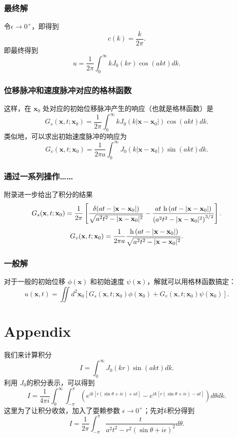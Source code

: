 \documentclass[CJK]{beamer}
\begin{document}
\begin{frame}
  \frametitle{最终解}
  令$\epsilon\rightarrow 0^+$，即得到
  $$c(k) = \frac{k}{2\pi}.$$
  即最终得到
  $$ u = \frac{1}{2\pi} \int_0^\infty  k J_0(kr)\cos(akt)  dk.$$
\end{frame}


\begin{frame}
  \frametitle{位移脉冲和速度脉冲对应的格林函数}
  这样，在 $\mathbf{x}_0$ 处对应的初始位移脉冲产生的响应（也就是格林函数）是
  $$ G_s(\mathbf{x},t;\mathbf{x}_0) = \frac{1}{2\pi} \int_0^\infty  k J_0(k|\mathbf{x}-\mathbf{x}_0|)\cos(akt)  dk.$$  
  类似地，可以求出初始速度脉冲的响应为
  $$ G_v(\mathbf{x},t;\mathbf{x}_0) = \frac{1}{2\pi a} \int_0^\infty   J_0(k|\mathbf{x}-\mathbf{x}_0|)\sin(akt)  dk.$$  
\end{frame}


\begin{frame}
  \frametitle{通过一系列操作……}
  附录进一步给出了积分的结果
  $$ G_s(\mathbf{x},t;\mathbf{x}_0) =\frac{1}{2\pi}\left[ \frac{\delta(at-|\mathbf{x}-\mathbf{x}_0|)}{\sqrt{a^2t^2-|\mathbf{x}-\mathbf{x}_0|^2}} - \frac{at\, \,\mathrm{h}\,(at-|\mathbf{x}-\mathbf{x}_0|)}{\left(a^2t^2-|\mathbf{x}-\mathbf{x}_0|^2\right)^{3/2}}\right].$$
  $$ G_v(\mathbf{x},t;\mathbf{x}_0) = \frac{1}{2\pi a}\frac{\,\mathrm{h}\,(at-|\mathbf{x}-\mathbf{x}_0|)}{\sqrt{a^2t^2-|\mathbf{x}-\mathbf{x}_0|^2}}.$$
\end{frame}


\begin{frame}
  \frametitle{一般解}
  对于一般的初始位移 $\phi(\mathbf{x})$ 和初始速度 $\psi(\mathbf{x})$，解就可以用格林函数搞定：
 $$u(\mathbf{x},t) = \iint d^2\mathbf{x}_0   \left[G_s(\mathbf{x},t;\mathbf{x}_0) \phi(\mathbf{x}_0) + G_v(\mathbf{x},t;\mathbf{x}_0) \psi(\mathbf{x}_0)\right].$$
\end{frame}



\section{Appendix}


\begin{frame}
  我们来计算积分
  $$I= \int_0^\infty   J_0(kr)\sin(akt)  dk.$$  
  利用 $J_0$的积分表示，可以得到
  $$ I = \frac{1}{4\pi i} \int_0^\infty  \int_{-\pi}^{\pi} \left(e^{ik[r(\sin\theta+i\epsilon)+at]}- e^{ik[r(\sin\theta+i\epsilon)-at]}\right)d\theta dk.  $$
  这里为了让积分收敛，加入了耍赖参数 $\epsilon\rightarrow 0^+$；先对$k$积分得到
  $$ I = \frac{1}{2\pi}\int_{-\pi}^{\pi} \frac{t}{a^2t^2-r^2(\sin\theta + i\epsilon)^2 } d\theta.$$
\end{frame}
\end{document}
